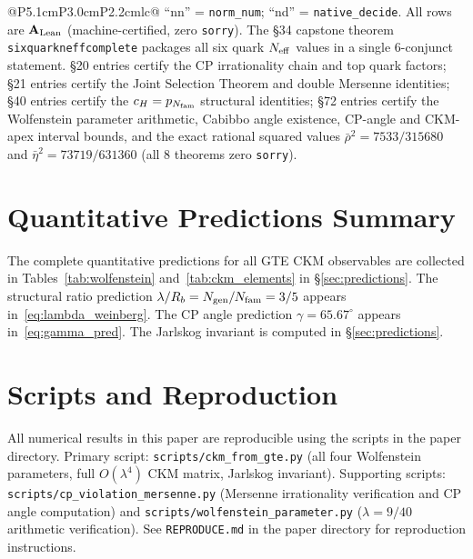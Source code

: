\documentclass[11pt]{article}
\theoremstyle{remark}
\newcommand{\Ngen}{N_{\rm gen}}
\newcommand{\Nfam}{N_{\rm fam}}
\newcommand{\cH}{c_H}
\newcommand{\lean}[1]{%
  \penalty-100
  \begingroup\def\_{\textunderscore\allowbreak}\texttt{#1}\endgroup}
\newcommand{\lam}{\lambda}
\newcommand{\Rb}{R_b}
\newcommand{\CatAL}{\ensuremath{\textbf{A}_{\rm Lean}}}
\begin{document}
\begin{appendices}
\begin{longtable}{@{}P{5.1cm}P{3.0cm}P{2.2cm}lc@{}}
{``nn'' = \texttt{norm\_num}; ``nd'' = \texttt{native\_decide}.
All rows are $\CatAL$ (machine-certified, zero \texttt{sorry}).
The \S34 capstone theorem \lean{six\_quark\_neff\_complete} packages all six quark
$N_{\rm eff}$ values in a single 6-conjunct statement.
\S20 entries certify the CP irrationality chain and top quark factors;
\S21 entries certify the Joint Selection Theorem and double Mersenne identities;
\S40 entries certify the $\cH = p_{\Nfam}$ structural identities;
\S72 entries certify the Wolfenstein parameter arithmetic, Cabibbo angle existence,
CP-angle and CKM-apex interval bounds, and the exact rational squared values
$\bar\rho^2 = 7533/315680$ and $\bar\eta^2 = 73719/631360$
(all 8 theorems zero \texttt{sorry}).}
\label{tab:lean_inventory}
\end{longtable}

\section{Quantitative Predictions Summary}
\label{app:predictions}

The complete quantitative predictions for all GTE CKM observables are collected in
Tables~\ref{tab:wolfenstein} and~\ref{tab:ckm_elements} in \S\ref{sec:predictions}.
The structural ratio prediction $\lam/\Rb = \Ngen/\Nfam = 3/5$ appears in~\eqref{eq:lambda_weinberg}.
The CP angle prediction $\gamma = 65.67^\circ$ appears in~\eqref{eq:gamma_pred}.
The Jarlskog invariant is computed in \S\ref{sec:predictions}.

\section{Scripts and Reproduction}
\label{app:reproduction}

All numerical results in this paper are reproducible using the scripts in the paper
directory.
Primary script: \texttt{scripts/ckm\_from\_gte.py} (all four Wolfenstein parameters,
full $O(\lam^4)$ CKM matrix, Jarlskog invariant).
Supporting scripts: \texttt{scripts/cp\_violation\_mersenne.py} (Mersenne irrationality
verification and CP angle computation) and \texttt{scripts/wolfenstein\_parameter.py}
($\lam = 9/40$ arithmetic verification).
See \texttt{REPRODUCE.md} in the paper directory for reproduction instructions.

\end{appendices}



\end{document}
